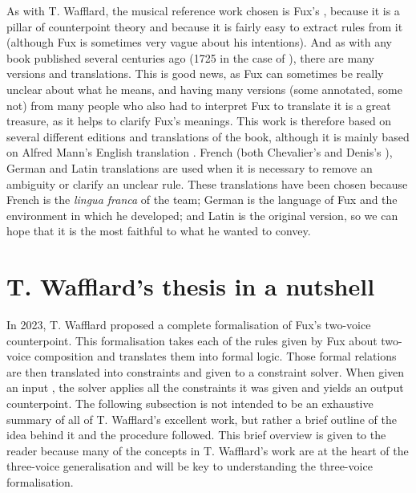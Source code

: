 As with T. Wafflard, the musical reference work chosen is Fux's \gap, because it is a pillar of counterpoint theory and because it is fairly easy to extract rules from it (although Fux is sometimes very vague about his intentions). And as with any book published several centuries ago (1725 in the case of \gap), there are many versions and translations. This is good news, as Fux can sometimes be really unclear about what he means, and having many versions (some annotated, some not) from many people who also had to interpret Fux to translate it is a great treasure, as it helps to clarify Fux's meanings. This work is therefore based on several different editions and translations of the book, although it is mainly based on Alfred Mann's English translation \cite{GaPEng}. French (both Chevalier's \cite{GaPFrChevalier} and Denis's \cite{GaPFrDenis}), German \cite{GaPDe} and Latin \cite{GapLa} translations are used when it is necessary to remove an ambiguity or clarify an unclear rule. These translations have been chosen because French is the \textit{lingua franca} of the team; German is the language of Fux and the environment in which he developed; and Latin is the original version, so we can hope that it is the most faithful to what he wanted to convey.



\section{T. Wafflard's thesis in a nutshell}\label{section:thomas-in-a-nutshell}

In 2023, T. Wafflard proposed a complete formalisation of Fux's two-voice counterpoint. This formalisation takes each of the rules given by Fux about two-voice composition and translates them into formal logic. Those formal relations are then translated into constraints and given to a constraint solver. When given an input \cf, the solver applies all the constraints it was given and yields an output counterpoint. The following subsection is not intended to be an exhaustive summary of all of T. Wafflard's excellent work, but rather a brief outline of the idea behind it and the procedure followed. This brief overview is given to the reader because many of the concepts in T. Wafflard's work are at the heart of the three-voice generalisation and will be key to understanding the three-voice formalisation.

